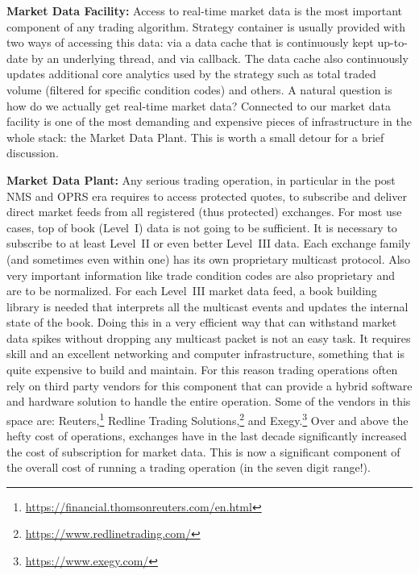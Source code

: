 \noindent\textbf{Market Data Facility:} Access to real-time market data is the most important component of any trading algorithm. Strategy container is usually provided with two ways of accessing this data: via a data cache that is continuously kept up-to-date by an underlying thread, and via callback. The data cache also continuously updates additional core analytics used by the strategy such as total traded volume (filtered for specific condition codes) and others. A natural question is how do we actually get real-time market data? Connected to our market data facility is one of the most demanding and expensive pieces of infrastructure in the whole stack: the Market Data Plant. This is worth a small detour for a brief discussion. \twomedskip


\noindent\textbf{Market Data Plant:}  Any serious trading operation, in particular in the post NMS and OPRS era requires to access protected quotes, to subscribe and deliver direct market feeds from all registered (thus protected) exchanges. For most use cases, top of book (Level~I) data is not going to be sufficient. It is necessary to subscribe to at least Level~II or even better Level~III data. Each exchange family (and sometimes even within one) has its own proprietary multicast protocol. Also very important information like trade condition codes are also proprietary and are to be normalized. For each Level~III\label{in:level3dat4} market data feed, a book building library is needed that interprets all the multicast events and updates the internal state of the book. Doing this in a very efficient way that can withstand market data spikes without dropping any multicast packet is not an easy task. It requires skill and an excellent networking and computer infrastructure, something that is quite expensive to build and maintain. For this reason trading operations often rely on third party vendors for this component that can provide a hybrid software and hardware solution to handle the entire operation. Some of the vendors in this space are: Reuters,\footnote{\url{https://financial.thomsonreuters.com/en.html}} Redline Trading Solutions,\footnote{\url{https://www.redlinetrading.com/}} and Exegy.\footnote{\url{https://www.exegy.com/}} Over and above the hefty cost of operations, exchanges have in the last decade significantly increased the cost of subscription for market data. This is now a significant component of the overall cost of running a trading operation (in the seven digit range!). \twomedskip


